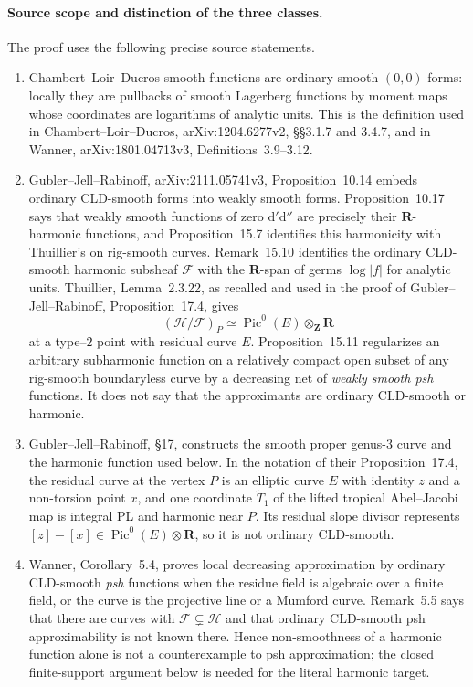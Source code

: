
\paragraph{Source scope and distinction of the three classes.}
The proof uses the following precise source statements.
\begin{enumerate}
\item Chambert--Loir--Ducros smooth functions are ordinary smooth
$(0,0)$-forms: locally they are pullbacks of smooth Lagerberg functions by
moment maps whose coordinates are logarithms of analytic units.  This is
the definition used in Chambert--Loir--Ducros, arXiv:1204.6277v2,
\S\S3.1.7 and 3.4.7, and in Wanner, arXiv:1801.04713v3,
Definitions~3.9--3.12.
\item Gubler--Jell--Rabinoff, arXiv:2111.05741v3,
Proposition~10.14 embeds ordinary CLD-smooth forms into weakly smooth forms.
Proposition~10.17 says that weakly smooth functions of zero
$\mathrm d'\mathrm d''$ are precisely their $\mathbf R$-harmonic
functions, and Proposition~15.7 identifies this harmonicity with
Thuillier's on rig-smooth curves.  Remark~15.10 identifies the ordinary
CLD-smooth harmonic
subsheaf $\mathcal F$ with the $\mathbf R$-span of germs $\log|f|$ for
analytic units.  Thuillier, Lemma~2.3.22, as recalled and used in the proof
of Gubler--Jell--Rabinoff, Proposition~17.4, gives
\[
 (\mathcal H/\mathcal F)_P
       \simeq \operatorname{Pic}^0(E)\otimes_{\mathbf Z}\mathbf R
\]
at a type--$2$ point with residual curve $E$.
Proposition~15.11 regularizes an arbitrary subharmonic function on a
relatively compact open subset of any rig-smooth boundaryless curve by a
decreasing net of \emph{weakly smooth psh} functions.  It does not say that
the approximants are ordinary CLD-smooth or harmonic.
\item Gubler--Jell--Rabinoff, \S17, constructs the smooth proper genus-$3$
curve and the harmonic function used below.  In the notation of their
Proposition~17.4, the residual curve at the vertex $P$ is an elliptic curve
$E$ with identity $z$ and a non-torsion point $x$, and one coordinate
$\widetilde T_1$ of the lifted tropical Abel--Jacobi map is integral PL and
harmonic near $P$.  Its residual slope divisor represents
$[z]-[x]\in\operatorname{Pic}^0(E)\otimes\mathbf R$, so it is not
ordinary CLD-smooth.
\item Wanner, Corollary~5.4, proves local decreasing approximation by
ordinary CLD-smooth \emph{psh} functions when the residue field is
algebraic over a finite field, or the curve is the projective line or a
Mumford curve.  Remark~5.5 says that there are curves with
$\mathcal F\subsetneq\mathcal H$ and that ordinary CLD-smooth psh
approximability is not known there.  Hence non-smoothness of a harmonic
function alone is not a counterexample to psh approximation; the closed
finite-support argument below is needed for the literal harmonic target.
\end{enumerate}
